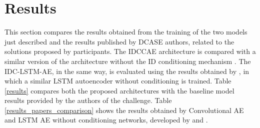 \section{Results}
This section compares the results obtained from the training of the two models just described and the results published by DCASE authors, related to the solutions proposed by participants. The IDCCAE architecture is compared with a similar version of the architecture without the ID conditioning mechanism \cite{15DeepDenseConvAE}. The IDC-LSTM-AE, in the same way, is evaluated using the results obtained by \cite{16LSTMDeepAutoencodersForASDtask}, in which a similar LSTM autoencoder without conditioning is trained. 
Table \ref{results} compares both the proposed architectures with the baseline model results provided by the authors of the challenge.
Table \ref{results_papers_comparison} shows the results obtained by Convolutional AE and LSTM AE without conditioning networks, developed by \cite{15DeepDenseConvAE} and \cite{16LSTMDeepAutoencodersForASDtask}.

